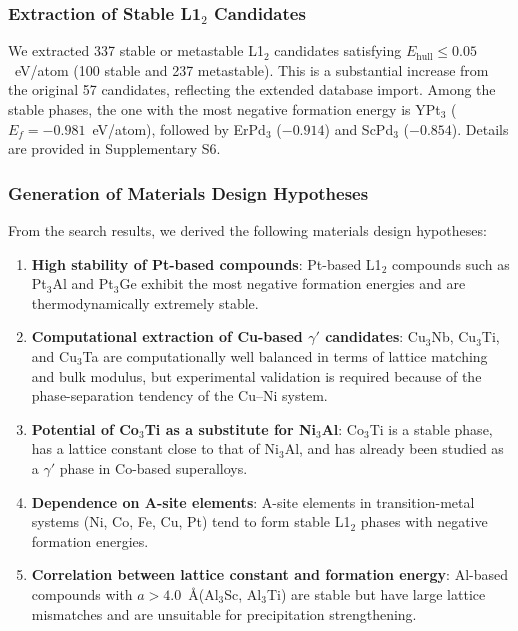\documentclass[5p,twocolumn]{elsarticle}
\begin{document}
\subsubsection{Extraction of Stable L1$_2$ Candidates}

We extracted 337 stable or metastable L1$_2$ candidates satisfying
$E_\text{hull} \leq 0.05$~eV/atom
(100 stable and 237 metastable).
This is a substantial increase from the original 57 candidates, reflecting the extended database import.
Among the stable phases, the one with the most negative formation energy is
YPt$_3$ ($E_f = -0.981$~eV/atom),
followed by ErPd$_3$ ($-0.914$) and ScPd$_3$ ($-0.854$).
Details are provided in Supplementary S6.

\subsubsection{Generation of Materials Design Hypotheses}

From the search results, we derived the following materials design hypotheses:

\begin{enumerate}
  \item \textbf{High stability of Pt-based compounds}:
    Pt-based L1$_2$ compounds such as Pt$_3$Al and Pt$_3$Ge
    exhibit the most negative formation energies and are thermodynamically extremely stable.
  \item \textbf{Computational extraction of Cu-based $\gamma'$ candidates}:
    Cu$_3$Nb, Cu$_3$Ti, and Cu$_3$Ta are computationally well balanced in terms of lattice matching and bulk modulus,
    but experimental validation is required because of the phase-separation tendency of the Cu--Ni system.
  \item \textbf{Potential of Co$_3$Ti as a substitute for Ni$_3$Al}:
    Co$_3$Ti is a stable phase, has a lattice constant close to that of Ni$_3$Al,
    and has already been studied as a $\gamma'$ phase in Co-based superalloys.
  \item \textbf{Dependence on A-site elements}:
    A-site elements in transition-metal systems (Ni, Co, Fe, Cu, Pt)
    tend to form stable L1$_2$ phases with negative formation energies.
  \item \textbf{Correlation between lattice constant and formation energy}:
    Al-based compounds with $a > 4.0$~\AA (Al$_3$Sc, Al$_3$Ti) are stable
    but have large lattice mismatches and are unsuitable for precipitation strengthening.
\end{enumerate}
\end{document}
